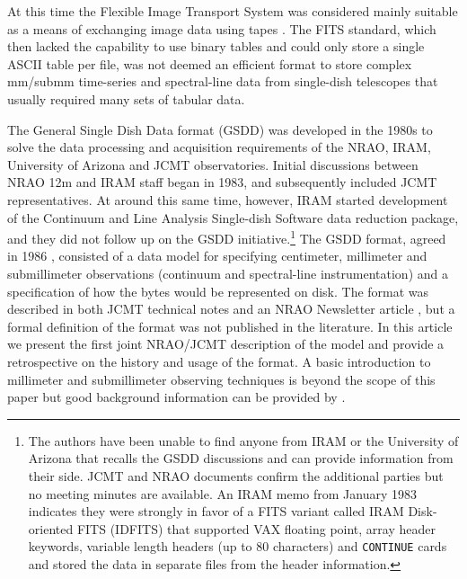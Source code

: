 \documentclass[final,authoryear,5p,times,twocolumn]{elsarticle}
\newcommand{\ascl}[1]{\href{http://www.ascl.net/#1}{ascl:#1}}
\begin{document}
At this time the Flexible Image Transport System
\citep[FITS;][]{1981A&AS...44..363W} was considered mainly
suitable as a means of exchanging image data using tapes
\citep{1980SPIE..264..298G}. The FITS standard, which then
lacked the capability to use binary tables and could only store a
single ASCII table per file, was not deemed an
efficient format to store complex mm/submm time-series and
spectral-line data from single-dish telescopes that usually required
many sets of tabular data.

The General Single Dish Data format (GSDD) was developed in the 1980s
to solve the data processing and acquisition requirements of the NRAO,
IRAM, University of Arizona and JCMT observatories.  Initial
discussions between NRAO 12m and IRAM staff began in 1983, and
subsequently included JCMT representatives. At around this same time,
however, IRAM started development of the Continuum and Line Analysis
Single-dish Software
\citep[][\ascl{1305.010}]{2005sf2a.conf..721P} data reduction package,
and they did not follow up on the GSDD initiative.\footnote{The
  authors have been unable to find anyone from IRAM or the University
  of Arizona that recalls the GSDD discussions and can provide
  information from their side. JCMT and NRAO documents confirm the
  additional parties but no meeting minutes are available. An IRAM
  memo from January 1983 indicates they were strongly in favor of a
  FITS variant called IRAM Disk-oriented FITS (IDFITS) that supported
  VAX floating point, array header keywords, variable length headers
  (up to 80 characters) and \texttt{CONTINUE} cards and stored the
  data in separate files from the header information.}  The GSDD
format, agreed in 1986 \citep[see e.g.,][]{mtdn84,1987NRAO30},
consisted of a data model for specifying centimeter, millimeter and
submillimeter observations (continuum and spectral-line
instrumentation) and a specification of how the bytes would be
represented on disk.  The format was described in both JCMT technical
notes \citep{mtdn84,mtdn85,SUN229} and an NRAO Newsletter article
\citep{1987NRAO30}, but a formal definition of the format was not
published in the literature. In this article we present the first
joint NRAO/JCMT description of the model and provide a retrospective
on the history and usage of the format.
A basic introduction to millimeter and submillimeter observing
techniques is beyond the scope of this paper but good background
information can be provided by \citet{2002ASPC..278.....S}.
\end{document}
